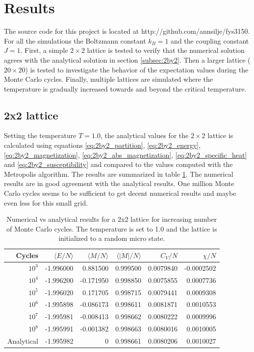 \documentclass{article}
\begin{document}
\FloatBarrier
\section{Results}
\label{sec:results}
The source code for this project is located at http://github.com/annsilje/fys3150. For all the simulations the Boltzmann constant $k_B=1$ and the coupling constant $J=1$. First, a simple $2\times 2$ lattice is tested to verify that the numerical solution agrees with the analytical solution in section \ref{subsec:2by2}. Then a larger lattice ($20 \times 20$) is tested to investigate the behavior of the expectation values during the Monte Carlo cycles. Finally, multiple lattices are simulated where the temperature is gradually increased towards and beyond the critical temperature. 

\FloatBarrier
\subsection{2x2 lattice}
Setting the temperature $T=1.0$, the analytical values for the $2\times 2$ lattice is calculated using equations \ref{eq:2by2_partition}, \ref{eq:2by2_energy}, \ref{eq:2by2_magnetization}, \ref{eq:2by2_abs_magnetization}, \ref{eq:2by2_specific_heat} and \ref{eq:2by2_susceptibility} and compared to the values computed with the Metropolis algorithm. The results are summarized in table \ref{tab:analytical_vs_numerical}. The numerical results are in good agreement with the analytical results. One million Monte Carlo cycles seems to be sufficient to get decent numerical results and maybe even less for this small grid. 

\begin{table}
\centering
\caption{Numerical vs analytical results for a 2x2 lattice for increasing number of Monte Carlo cycles. The temperature is set to 1.0 and the lattice is initialized to a random micro state. }
\label{tab:analytical_vs_numerical}
\begin{tabularx}{\textwidth}{r r r r r r}
\hline
Cycles & $\langle E/N \rangle$ & $\langle M/N \rangle$& $\langle |M|/N \rangle$ & $C_V/N$ & $\chi/N$  \\
\hline\hline
$10^3$ & -1.996000 &  0.881500 & 0.999500 & 0.0079840 & -0.0002502\\
$10^4$ & -1.996200 & -0.171950 & 0.998850 & 0.0075855 &  0.0007736\\
$10^5$ & -1.996020 &  0.171705 & 0.998715 & 0.0079441 &  0.0009308\\
$10^6$ & -1.995898 & -0.086173 & 0.998611 & 0.0081871 &  0.0010553\\ 
$10^7$ & -1.995981 & -0.008413 & 0.998662 & 0.0080222 &  0.0009996\\
$10^8$ & -1.995991 & -0.001382 & 0.998663 & 0.0080016 &  0.0010005\\
\hline \hline
Analytical & -1.995982 & 0 & 0.998661  & 0.0080206 & 0.0010027 \\
\hline
\end{tabularx}
\end{table}
\end{document}
